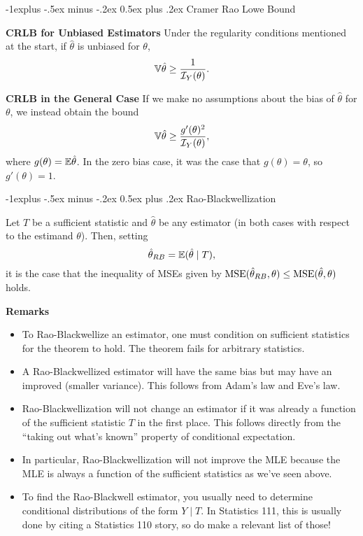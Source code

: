 \documentclass[10pt,landscape]{article}
\makeatletter
\renewcommand{\subsection}{\@startsection{subsection}{2}{0mm}%
                                {-1explus -.5ex minus -.2ex}%
                                {0.5ex plus .2ex}%
                                {\normalfont\normalsize\bfseries}}
\makeatother
\begin{document}
\begin{multicols*}{3}
\subsection{Cramer Rao Lowe Bound}

\textbf{CRLB for Unbiased Estimators}
Under the regularity conditions mentioned at the start, if $\hat{\theta}$ is unbiased for $\theta$, $$\mathbb{V} \hat{\theta}\geq \frac{1}{\mathcal{I}_Y(\theta)}.$$ 

\textbf{CRLB in the General Case}
If we make no assumptions about the bias of $\hat{\theta}$ for $\theta$, we instead obtain the bound $$\mathbb{V} \hat{\theta}\geq \frac{g'(\theta)^2}{\mathcal{I}_Y(\theta)},$$ where $g(\theta)=\mathbb{E} \hat{\theta}$. In the zero bias case, it was the case that $g(\theta)=\theta$, so $g'(\theta)=1$.

\subsection{Rao-Blackwellization}

Let $T$ be a sufficient statistic and $\hat{\theta}$ be any estimator (in both cases with respect to the estimand $\theta$). Then, setting $$\hat{\theta}_{RB}=\mathbb{E} (\hat{\theta}\mid T),$$ it is the case that the inequality of MSEs given by $\operatorname{MSE}(\hat{\theta}_{RB},\theta)\leq \operatorname{MSE}(\hat{\theta},\theta)$ holds.

\textbf{Remarks}
\begin{itemize}
    \item To Rao-Blackwellize an estimator, one must condition on sufficient statistics for the theorem to hold. The theorem fails for arbitrary statistics.
    \item A Rao-Blackwellized estimator will have the same bias but may have an improved (smaller variance). This follows from Adam's law and Eve's law.
    \item Rao-Blackwellization will not change an estimator if it was already a function of the sufficient statistic $T$ in the first place. This follows directly from the ``taking out what's known'' property of conditional expectation.
    \item In particular, Rao-Blackwellization will not improve the MLE because the MLE is always a function of the sufficient statistics as we've seen above.
    \item To find the Rao-Blackwell estimator, you usually need to determine conditional distributions of the form $Y\mid T$. In Statistics 111, this is usually done by citing a Statistics 110 story, so do make a relevant list of those!
\end{itemize}




\end{multicols*}
\end{document}
